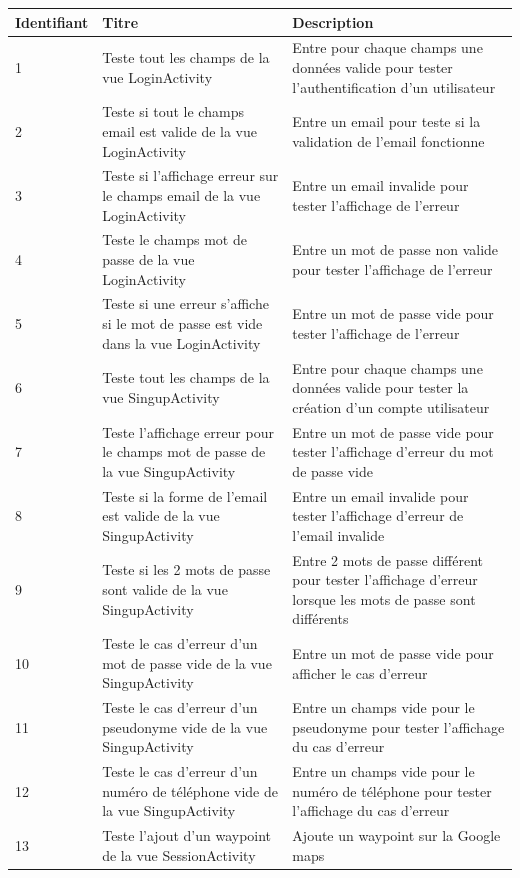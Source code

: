 \documentclass[titlepage, 12pt]{report}
\begin{document}
\begin{tabularx}{\textwidth}{|X|X|X|}
	\hline
	Identifiant & Titre & Description \\
	\hline
	1 & Teste tout les champs de la vue LoginActivity & Entre pour chaque champs une données valide pour tester l'authentification d'un utilisateur \\
	\hline
	2 & Teste si tout le champs email est valide de la vue LoginActivity & Entre un email pour teste si la validation de l'email fonctionne \\	
	\hline
	3 & Teste si l'affichage erreur sur le champs email de la vue LoginActivity & Entre un email invalide pour tester l'affichage de l'erreur \\
	\hline
	4 & Teste le champs mot de passe de la vue LoginActivity & Entre un mot de passe non valide pour tester l'affichage de l'erreur \\
	\hline
	5 & Teste si une erreur s'affiche si le mot de passe est vide dans la vue LoginActivity & Entre un mot de passe vide pour tester l'affichage de l'erreur \\
	\hline
	6 & Teste tout les champs de la vue SingupActivity & Entre pour chaque champs une données valide pour tester la création d'un compte utilisateur \\
	\hline
	7 & Teste l'affichage erreur pour le champs mot de passe de la vue SingupActivity & Entre un mot de passe vide pour tester l'affichage d'erreur du mot de passe vide \\
	\hline
	8 & Teste si la forme de l'email est valide de la vue SingupActivity & Entre un email invalide pour tester l'affichage d'erreur de l'email invalide  \\
	\hline
	9 & Teste si les 2 mots de passe sont valide de la vue SingupActivity & Entre 2 mots de passe différent pour tester l'affichage d'erreur lorsque les mots de passe sont différents \\
	\hline
	10 & Teste le cas d'erreur d'un mot de passe vide de la vue SingupActivity & Entre un mot de passe vide pour afficher le cas d'erreur  \\
	\hline
	11 & Teste le cas d'erreur d'un pseudonyme vide  de la vue SingupActivity & Entre un champs vide pour le pseudonyme pour tester l'affichage du cas d'erreur \\
	\hline
	12 & Teste le cas d'erreur d'un numéro de téléphone vide de la vue SingupActivity & Entre un champs vide pour le numéro de téléphone pour tester l'affichage du cas d'erreur  \\
	\hline
	13 & Teste l'ajout d'un waypoint de la vue SessionActivity & Ajoute un waypoint sur la Google maps  \\

\end{tabularx}
\end{document}
